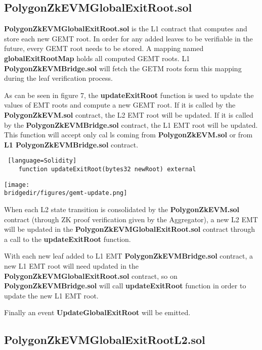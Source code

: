 \subsection{PolygonZkEVMGlobalExitRoot.sol}


\textbf{PolygonZkEVMGlobalExitRoot.sol} is the L1 contract that computes and store each new GEMT root. In order for any added leaves to be verifiable in the future, every GEMT root needs to be stored. A mapping named \textbf{globalExitRootMap} holds all computed GEMT roots. L1 \textbf{PolygonZkEVMBridge.sol} will fetch the GETM roots form this mapping during the leaf verification process.

As can be seen in figure 7, the \textbf{updateExitRoot} function is used to update the values of EMT roots and compute a new GEMT root. If it is called by the \textbf{PolygonZkEVM.sol} contract, the L2 EMT root will be updated. If it is called by the \textbf{PolygonZkEVMBridge.sol} contract, the L1 EMT root will be updated. This function will accept only cal
ls coming  from \textbf{PolygonZkEVM.sol} or from \textbf{L1 PolygonZkEVMBridge.sol} contract.
\begin{lstlisting} [language=Solidity]
	function updateExitRoot(bytes32 newRoot) external 
\end{lstlisting}

\begin{center}
	\texttt{[image: \\bridgedir/figures/gemt-update.png]}
	
	
\end{center}


When each L2 state transition is consolidated by the \textbf{PolygonZkEVM.sol} contract (through ZK proof verification given by the Aggregator), a new L2 EMT will be updated in the \textbf{PolygonZkEVMGlobalExitRoot.sol} contract through a call to the \textbf{updateExitRoot} function.

With each new leaf added to L1 EMT \textbf{PolygonZkEVMBridge.sol} contract, a new L1 EMT root will need updated in the \textbf{PolygonZkEVMGlobalExitRoot.sol} contract, so on \textbf{PolygonZkEVMBridge.sol} will call \textbf{updateExitRoot} function in order to update the new L1 EMT root.

Finally an event \textbf{UpdateGlobalExitRoot} will be emitted.

\subsection{PolygonZkEVMGlobalExitRootL2.sol}

